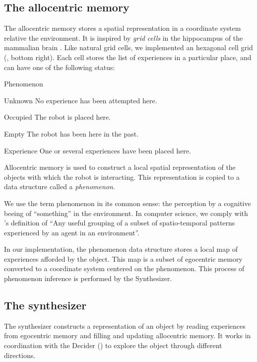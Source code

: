 \documentclass[pmlr]{jmlr}%
\begin{document}
\subsection{The allocentric memory}

The allocentric memory stores a spatial representation in a coordinate system relative the environment. 
It is inspired by \textit{grid cells} in the hippocampus of the mammalian brain \citep{grieves_representation_2017}.
Like natural grid cells, we implemented an hexagonal cell grid (, bottom right). 
Each cell stores the list of experiences in a particular place, and can have one of the following status:

\begin{altdescription}{Phenomenon}
	\item[Unknown] No experience has been attempted here.
	\item[Occupied] The robot is placed here.
	\item[Empty] The robot has been here in the past.
	\item[Experience] One or several experiences have been placed here.
\end{altdescription}

Allocentric memory is used to construct a local spatial representation of the objects with which the robot is interacting.
This representation is copied to a data structure called a \textit{phenomenon}.

We use the term phenomenon in its common sense: the perception by a cognitive beeing of ``something'' in the environment.
In computer science, we comply with \cite{thorisson_explanation_2021}'s definition of ``Any useful grouping of a subset of spatio-temporal patterns experienced by an agent in an environment''.

In our implementation, the phenomenon data structure stores a local map of experiences afforded by the object. 
This map is a subset of egocentric memory converted to a coordinate system centered on the phenomenon.
This process of phenomenon inference is performed by the Synthesizer.

\subsection{The synthesizer}
\label{sec:synthesizer}


The synthesizer constructs a representation of an object by reading experiences from egocentric memory and filling and updating allocentric memory. 
It works in coordination with the Decider () to explore the object through different directions. 
\end{document}
